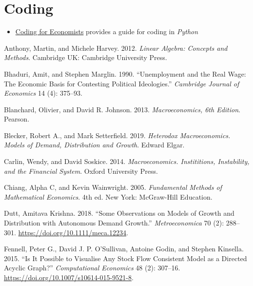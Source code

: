 \documentclass[
  letterpaper,
  DIV=11,
  numbers=noendperiod]{scrreprt}
\providecommand{\tightlist}{%
  \setlength{\itemsep}{0pt}\setlength{\parskip}{0pt}}\usepackage{longtable,booktabs,array}
\newlength{\cslhangindent}
\newenvironment{CSLReferences}[2] %
 {\begin{list}{}{%
  \setlength{\itemindent}{0pt}
  \setlength{\leftmargin}{0pt}
  \setlength{\parsep}{0pt}
  \ifodd #1
   \setlength{\leftmargin}{\cslhangindent}
   \setlength{\itemindent}{-1\cslhangindent}
  \fi
  \setlength{\itemsep}{#2\baselineskip}}}
 {\end{list}}
\begin{document}
\section*{Coding}\label{coding}


\begin{itemize}
\tightlist
\item
  \href{https://aeturrell.github.io/coding-for-economists/intro.html}{Coding
  for Economists} provides a guide for coding in \emph{Python}
\end{itemize}

\label{refs}
\begin{CSLReferences}{1}{0}
Anthony, Martin, and Michele Harvey. 2012. \emph{{Linear Algebra:
Concepts and Methods}}. Cambridge UK: {Cambridge University Press}.

Bhaduri, Amit, and Stephen Marglin. 1990. {``Unemployment and the Real
Wage: The Economic Basis for Contesting Political Ideologies.''}
\emph{Cambridge Journal of Economics} 14 (4): 375--93.

Blanchard, Olivier, and David R. Johnson. 2013. \emph{Macroeconomics,
6th Edition}. Pearson.

Blecker, Robert A., and Mark Setterfield. 2019. \emph{Heterodox
Macroeconomics. Models of Demand, Distribution and Growth}. Edward
Elgar.

Carlin, Wendy, and David Soskice. 2014. \emph{Macroeconomics.
Instititions, Instability, and the Financial System}. Oxford University
Press.

Chiang, Alpha C, and Kevin Wainwright. 2005. \emph{Fundamental {Methods}
of {Mathematical Economics}}. 4th ed. New York: {McGraw-Hill Education}.

Dutt, Amitava Krishna. 2018. {``Some Observations on Models of Growth
and Distribution with Autonomous Demand Growth.''} \emph{Metroeconomica}
70 (2): 288--301. \url{https://doi.org/10.1111/meca.12234}.

Fennell, Peter G., David J. P. O'Sullivan, Antoine Godin, and Stephen
Kinsella. 2015. {``Is It Possible to Visualise Any Stock Flow Consistent
Model as a Directed Acyclic Graph?''} \emph{Computational Economics} 48
(2): 307--16. \url{https://doi.org/10.1007/s10614-015-9521-8}.


\end{CSLReferences}
\end{document}

